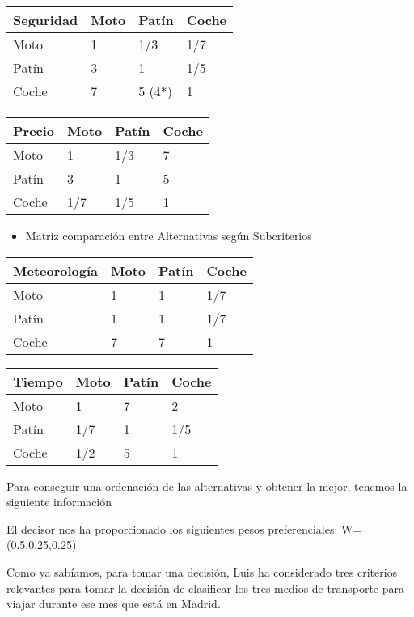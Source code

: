 \documentclass[
]{article}
\providecommand{\tightlist}{%
  \setlength{\itemsep}{0pt}\setlength{\parskip}{0pt}}
\begin{document}
\begin{longtable}[]{@{}llll@{}}
\toprule
Seguridad & Moto & Patín & Coche \\
\midrule
\endhead
Moto & 1 & 1/3 & 1/7 \\
Patín & 3 & 1 & 1/5 \\
Coche & 7 & 5 (4*) & 1 \\
\bottomrule
\end{longtable}

\begin{longtable}[]{@{}llll@{}}
\toprule
Precio & Moto & Patín & Coche \\
\midrule
\endhead
Moto & 1 & 1/3 & 7 \\
Patín & 3 & 1 & 5 \\
Coche & 1/7 & 1/5 & 1 \\
\bottomrule
\end{longtable}

\begin{itemize}
\tightlist
\item
  Matriz comparación entre Alternativas según Subcriterios
\end{itemize}

\begin{longtable}[]{@{}llll@{}}
\toprule
Meteorología & Moto & Patín & Coche \\
\midrule
\endhead
Moto & 1 & 1 & 1/7 \\
Patín & 1 & 1 & 1/7 \\
Coche & 7 & 7 & 1 \\
\bottomrule
\end{longtable}

\begin{longtable}[]{@{}llll@{}}
\toprule
Tiempo & Moto & Patín & Coche \\
\midrule
\endhead
Moto & 1 & 7 & 2 \\
Patín & 1/7 & 1 & 1/5 \\
Coche & 1/2 & 5 & 1 \\
\bottomrule
\end{longtable}

Para conseguir una ordenación de las alternativas y obtener la mejor,
tenemos la siguiente información

El decisor nos ha proporcionado los siguientes pesos preferenciales:
W=(0.5,0.25,0.25)

Como ya sabíamos, para tomar una decisión, Luis ha considerado tres
criterios relevantes para tomar la decisión de clasificar los tres
medios de transporte para viajar durante ese mes que está en Madrid.
\end{document}
